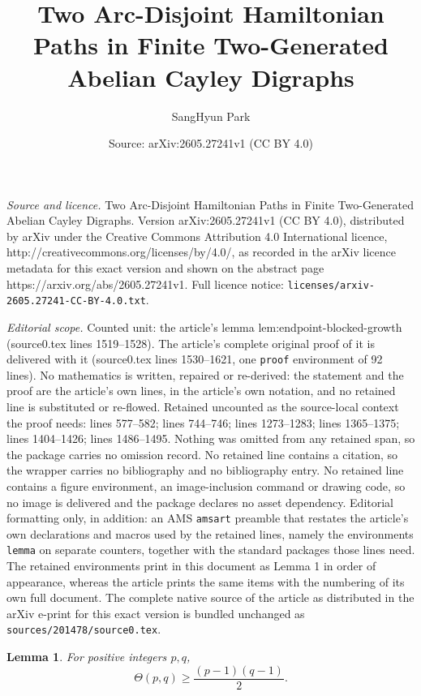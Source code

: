 \documentclass[10pt,a4paper]{amsart}
\title{Two Arc-Disjoint Hamiltonian Paths in Finite Two-Generated Abelian Cayley Digraphs}
\author{SangHyun Park}
\date{Source: arXiv:2605.27241v1 (CC BY 4.0)}
\newtheorem{lemma}{Lemma}
\begin{document}
\maketitle

\noindent\emph{Source and licence.} Two Arc-Disjoint Hamiltonian Paths in Finite Two-Generated Abelian Cayley Digraphs. Version arXiv:2605.27241v1 (CC BY 4.0), distributed by arXiv under the Creative Commons Attribution 4.0 International licence, http://creativecommons.org/licenses/by/4.0/, as recorded in the arXiv licence metadata for this exact version and shown on the abstract page https://arxiv.org/abs/2605.27241v1. Full licence notice: \texttt{licenses/arxiv-2605.27241-CC-BY-4.0.txt}.\par\smallskip

\noindent\textit{Editorial scope.} Counted unit: the article's lemma lem:endpoint-blocked-growth (source0.tex lines 1519--1528). The article's complete original proof of it is delivered with it (source0.tex lines 1530--1621, one \texttt{proof} environment of 92 lines). No mathematics is written, repaired or re-derived: the statement and the proof are the article's own lines, in the article's own notation, and no retained line is substituted or re-flowed.  Retained uncounted as the source-local context the proof needs: lines 577--582; lines 744--746; lines 1273--1283; lines 1365--1375; lines 1404--1426; lines 1486--1495.  Nothing was omitted from any retained span, so the package carries no omission record.  No retained line contains a citation, so the wrapper carries no bibliography and no bibliography entry.  No retained line contains a figure environment, an image-inclusion command or drawing code, so no image is delivered and the package declares no asset dependency.  Editorial formatting only, in addition: an AMS \texttt{amsart} preamble that restates the article's own declarations and macros used by the retained lines, namely the environments \texttt{lemma} on separate counters, together with the standard packages those lines need.  The retained environments print in this document as Lemma 1 in order of appearance, whereas the article prints the same items with the numbering of its own full document.  The complete native source of the article as distributed in the arXiv e-print for this exact version is bundled unchanged as \texttt{sources/201478/source0.tex}.
\begin{lemma}\label{lem:theta-bound}
For positive integers $p,q$,
\[
        \Theta(p,q)\ge \frac{(p-1)(q-1)}2.
\]
\end{lemma}
\end{document}
